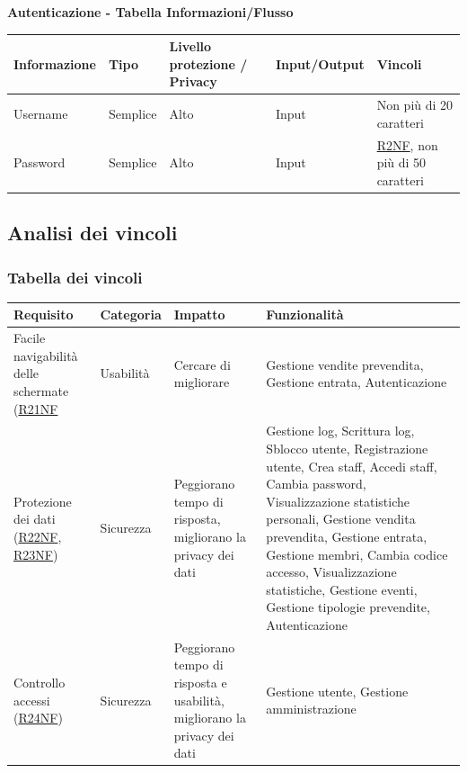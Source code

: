 \documentclass[a4paper]{article}
\begin{document}
\textbf{Autenticazione  - Tabella Informazioni/Flusso}

\begin{center}
    \begin{tabularx}{1\textwidth}{|X|l|X|X|X|}
        \hline
        \textbf{Informazione} &\textbf{Tipo} & \textbf{Livello protezione / Privacy} & \textbf{Input/Output} & \textbf{Vincoli}\\
        \hline
        \hline
        Username & Semplice & Alto & Input & Non più di 20 caratteri\\
        \hline
        Password & Semplice & Alto & Input & \hyperlink{R2NF}{R2NF}, non più di 50 caratteri\\
        \hline
    \end{tabularx}
\end{center}

\subsection{Analisi dei vincoli}
\subsubsection{Tabella dei vincoli}



\begin{center}
    \begin{tabularx}{1\textwidth}{|X|l|X|X|}
    \hline
    \textbf{Requisito} & \textbf{Categoria} & \textbf{Impatto} & \textbf{Funzionalità}\\
    \hline
    \hline
    Facile navigabilità delle schermate (\hyperlink{R21NF}{R21NF} & Usabilità & Cercare di migliorare & Gestione vendite prevendita,  Gestione entrata, Autenticazione\\
    \hline
    Protezione dei dati (\hyperlink{R22NF}{R22NF}, \hyperlink{R23NF}{R23NF}) & Sicurezza & Peggiorano tempo di risposta, migliorano la privacy dei dati & Gestione log, Scrittura log, Sblocco utente, Registrazione utente, Crea staff, Accedi staff, Cambia password, Visualizzazione statistiche personali, Gestione vendita prevendita, Gestione entrata, Gestione membri, Cambia codice accesso, Visualizzazione statistiche, Gestione eventi, Gestione tipologie prevendite, Autenticazione\\
    \hline
    Controllo accessi (\hyperlink{R24NF}{R24NF}) & Sicurezza & Peggiorano tempo di risposta e usabilità, migliorano la privacy dei dati & Gestione utente, Gestione amministrazione\\
    \hline
    \end{tabularx}
\end{center}
\end{document}
